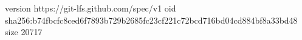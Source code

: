 version https://git-lfs.github.com/spec/v1
oid sha256:b74fbcfc8ced6f7893b729b2685fc23cf221c72bcd716bd04cd884bf8a33bd48
size 20717
